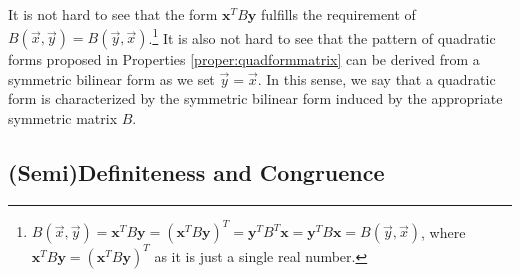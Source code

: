 It is not hard to see that the form $\textbf{x}^TB\textbf{y}$ fulfills the requirement of $B(\vec{x}, \vec{y}) = B(\vec{y}, \vec{x})$.\footnote{$B(\vec{x}, \vec{y}) = \textbf{x}^TB\textbf{y} = (\textbf{x}^TB\textbf{y})^T = \textbf{y}^TB^T\textbf{x} = \textbf{y}^TB\textbf{x} = B(\vec{y}, \vec{x})$, where $\textbf{x}^TB\textbf{y} = (\textbf{x}^TB\textbf{y})^T$ as it is just a single real number.} It is also not hard to see that the pattern of quadratic forms proposed in Properties \ref{proper:quadformmatrix} can be derived from a symmetric bilinear form as we set $\vec{y} = \vec{x}$. In this sense, we say that a quadratic form is characterized by the symmetric bilinear form induced by the appropriate symmetric matrix $B$.

\subsection{(Semi)Definiteness and Congruence}
\label{subsection:definiteness}

